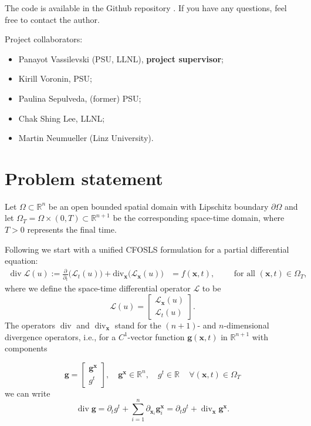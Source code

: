 \documentclass[a4paper,12pt]{amsart}
\numberwithin{equation}{section}
\renewcommand{\div}{\operatorname{div}}
\renewcommand{\L}{{\mathcal L}}
\def\XVec#1{{\mathbf #1}}
\def\Xx{\XVec{x}}
\begin{document}
The code is available in the Github repository \cite{cfosls_code}. If you have any questions, feel free to contact the author.

Project collaborators:
\begin{itemize}
	\item Panayot Vassilevski (PSU, LLNL), \textbf{project supervisor};
	\item Kirill Voronin, PSU;
	\item Paulina Sepulveda, (former) PSU;
	\item Chak Shing Lee, LLNL;
	\item Martin Neumueller (Linz University).
\end{itemize}

\section{Problem statement}


\bigskip

Let $\Omega\subset \mathbb{R}^n$ be an open bounded spatial domain with Lipschitz boundary $\partial \Omega$ and let 
$\Omega_{T} = \Omega\times (0,T)\subset \mathbb{R}^{n+1}$ be the corresponding space-time domain,  where $T>0$ represents the final time.  

Following \cite{our_cfosls_paper} we start with a unified CFOSLS formulation for a partial differential equation:
\begin{align} \label{Problem}
\div \L(u) := \frac{\partial}{\partial_t} \big(\L_t(u) \big)+ \mathrm{div}_\Xx \big( \L_\Xx (u)\big)& = f(\Xx, t), \qquad \text{ for all } (\Xx,t) \in \Omega_T,
\end{align}
where we define the space-time differential operator $\L$ to be
\[
\L(u) =  \begin{bmatrix} \L_\Xx(u) \\ \L_t(u) \end{bmatrix}.
\]
The operators $\div$ and $\div_\Xx$ stand for the $(n+1)$- and $n$-dimensional divergence operators, i.e., for a $C^1$-vector function $\mathbf{g}(\Xx,t)$ in $\mathbb{R}^{n+1}$ with components

$$
\mathbf{g} =  \begin{bmatrix} \mathbf{g}^\Xx 
\\ g^t \end{bmatrix}, \quad 
\mathbf{g}^\Xx \in \mathbb{R}^{n}, \quad g^t \in \mathbb{R} \quad \, \forall (\Xx,t) \in \Omega_T
$$
we can write
$$
\div \mathbf{g} = \partial_t g^t + \sum_{i = 1}^{n} \partial_{\Xx_i} \mathbf{g}^{\Xx}_i = \partial_t g^t + \div_\Xx \mathbf{g}^{\Xx}.
$$
\end{document}
